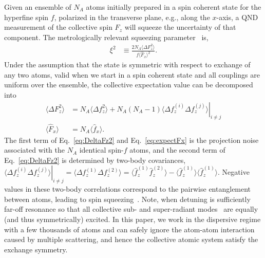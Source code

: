 \documentclass[preprint,aps,pra,onecolumn,superscriptaddress]{revtex4-1} %
\newcommand{\expect}[1]{\big\langle #1 \big\rangle}
\begin{document}
Given an ensemble of $N_A$ atoms initially prepared in a spin coherent state for the hyperfine spin $f$, polarized in the transverse plane, e.g., along the $x$-axis, a QND measurement of the collective spin  $F_z$ will squeeze the uncertainty of that component.  The metrologically relevant squeezing parameter~\cite{Wineland1992} is,
\begin{align}\label{eq:xi2Faraday}
\xi^2 &\equiv  \frac{2 N_A\expect{\Delta F_z ^2}}{f\expect{\hat{F}_x}^2}.
\end{align}
Under the assumption that the state is symmetric with respect to exchange of any two atoms, valid when we start in a spin coherent state and all couplings are uniform over the ensemble, the collective expectation value can be decomposed into 
\begin{subequations}\label{eq:Ftof_squeezing}
\begin{align}
\expect{\Delta F_z^2} &= N_A \expect{\Delta f_z^2}+N_A(N_A-1)\left. \expect{\Delta f_z^{(i)}\Delta f_z^{(j)}}\right|_{i\neq j}\label{eq:DeltaFz2}\\
\expect{\hat{F}_x } & =N_A \expect{\hat{f}_x} \label{eq:expectFx}.
\end{align}
\end{subequations}
 The first term of Eq.~\eqref{eq:DeltaFz2} and Eq.~\eqref{eq:expectFx} is the projection noise associated with the  $N_A$ identical spin-$f$  atoms, and  the second term of Eq.~\eqref{eq:DeltaFz2} is determined by two-body covariances, $ \left.\expect{\Delta f_z^{(i)}\Delta f_z^{(j)}}\right|_{i\neq j}=\expect{\Delta f_z^{(1)}\Delta f_z^{(2)}} = \expect{\hat{f}_z^{(1)}\hat{f}_z^{(2)}}-\expect{\hat{f}_z^{(1)}} \expect{\hat{f}_z^{(1)}} $.  Negative values in these two-body correlations correspond to the pairwise entanglement between atoms, leading to spin squeezing~\cite{Wang2003Spin}.  Note, when detuning is sufficiently far-off resonance so that all collective sub- and super-radiant modes~\cite{Asenjo-Garcia2017Atom,Asenjo-Garcia2017Exponential} are equally (and thus symmetrically) excited.  In this paper, we work in the dispersive regime with a few thousands of atoms and can safely ignore the atom-atom interaction caused by multiple scattering, and hence the collective atomic system satisfy the exchange symmetry. 
\end{document}
